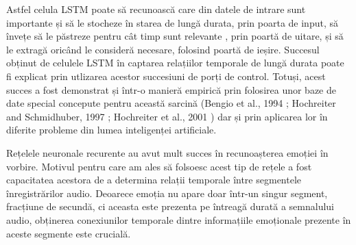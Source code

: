 \documentclass[a4paper,12pt]{book}
\begin{document}
				Astfel celula LSTM poate să recunoască care din datele de intrare sunt importante și să le stocheze în starea de lungă durata, prin poarta de input, să învețe să le păstreze pentru cât timp sunt relevante , prin poartă de uitare, și să le extragă oricând le consideră necesare, folosind poartă de ieșire. Succesul obținut de celulele LSTM în captarea relațiilor temporale de lungă durata poate fi explicat prin utlizarea acestor succesiuni de porți de control. Totuși, acest succes a fost demonstrat și într-o manieră empirică prin folosirea unor baze de date special concepute pentru această sarcină (Bengio et al., 1994 \cite{rnn3}; Hochreiter and Schmidhuber, 1997 \cite{rnn4}; Hochreiter et al., 2001 \cite{rnn5}) dar și prin aplicarea lor în diferite probleme din lumea inteligenței artificiale. \par
				
				Rețelele neuronale recurente au avut mult succes în recunoașterea emoției în vorbire. Motivul pentru care am ales să folsoesc acest tip de rețele a fost capacitatea acestora de a determina relații temporale între segmentele înregistrărilor audio. Deoarece emoția nu apare doar într-un singur segment, fracțiune de secundă, ci aceasta este prezenta pe întreagă durată a semnalului audio, obținerea  conexiunilor temporale dintre informațiile emoționale prezente în aceste segmente este crucială. 
				
\end{document}
